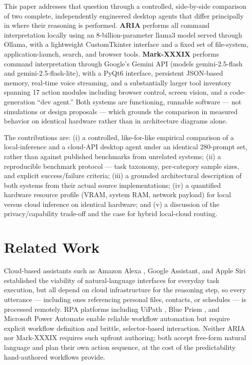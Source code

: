 \documentclass[conference]{IEEEtran}
\begin{document}
This paper addresses that question through a controlled, side-by-side comparison of two complete, independently engineered desktop agents that differ principally in where their reasoning is performed. \textbf{ARIA} performs all command interpretation locally using an 8-billion-parameter llama3 model served through Ollama, with a lightweight CustomTkinter interface and a fixed set of file-system, application-launch, search, and browser tools. \textbf{Mark-XXXIX} performs command interpretation through Google's Gemini API \cite{ref12} (models gemini-2.5-flash and gemini-2.5-flash-lite), with a PyQt6 interface, persistent JSON-based memory, real-time voice streaming, and a substantially larger tool inventory spanning 17 action modules including browser control, screen vision, and a code-generation ``dev agent.'' Both systems are functioning, runnable software --- not simulations or design proposals --- which grounds the comparison in measured behavior on identical hardware rather than in architecture diagrams alone.

The contributions are: (i) a controlled, like-for-like empirical comparison of a local-inference and a cloud-API desktop agent under an identical 280-prompt set, rather than against published benchmarks from unrelated systems; (ii) a reproducible benchmark protocol --- task taxonomy, per-category sample sizes, and explicit success/failure criteria; (iii) a grounded architectural description of both systems from their actual source implementations; (iv) a quantified hardware resource profile (VRAM, system RAM, network payload) for local versus cloud inference on identical hardware; and (v) a discussion of the privacy/capability trade-off and the case for hybrid local-cloud routing.

\section{Related Work}

Cloud-based assistants such as Amazon Alexa \cite{ref1}, Google Assistant, and Apple Siri established the viability of natural-language interfaces for everyday task execution, but all depend on cloud infrastructure for the reasoning step, so every utterance --- including ones referencing personal files, contacts, or schedules --- is processed remotely. RPA platforms including UiPath \cite{ref3}, Blue Prism \cite{ref14}, and Microsoft Power Automate \cite{ref15} enable reliable workflow automation but require explicit workflow definition and brittle, selector-based interaction. Neither ARIA nor Mark-XXXIX requires such upfront authoring; both accept free-form natural language and plan their own action sequence, at the cost of the predictability hand-authored workflows provide.
\end{document}
